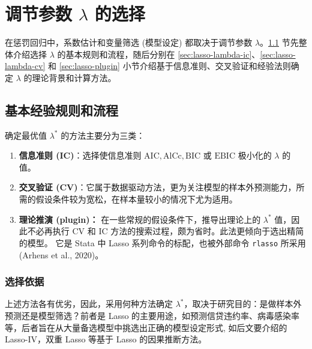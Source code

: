 


\section{调节参数 $\lambda$ 的选择}\label{sec:lasso-lambda}

在惩罚回归中，系数估计和变量筛选 (模型设定) 都取决于调节参数 $\lambda$。\ref{sec:lasso-lambda-intro} 节先整体介绍选择 $\lambda$ 的基本规则和流程，随后分别在 \ref{sec:lasso-lambda-ic}、\ref{sec:lasso-lambda-cv} 和 \ref{sec:lasso-plugin} 小节介绍基于信息准则、交叉验证和经验法则确定 $\lambda$ 的理论背景和计算方法。 

\subsection{基本经验规则和流程}\label{sec:lasso-lambda-intro}

确定最优值 $\lambda^*$ 的方法主要分为三类：
\begin{enumerate}
\item \textbf{信息准则 (IC)}：选择使信息准则 $\mathrm{AIC}, \mathrm{AlCc}, \mathrm{BIC}$ 或 $\mathrm{EBIC}$ 极小化的 $\lambda$ 的值。%
\item \textbf{交叉验证 (CV)}：它属于数据驱动方法，更为关注模型的样本外预测能力，所需的假设条件较为宽松，在样本量较小的情况下尤为适用。%
\item \textbf{理论推演 (plugin)：} 在一些常规的假设条件下，推导出理论上的 $\lambda^*$ 值，因此不必再执行 CV 和 IC 方法的搜索过程，颇为省时。此法更倾向于选出精简的模型。
它是 Stata 中 Lasso 系列命令的标配，也被外部命令 \texttt{rlasso} 所采用 (Arhens et al., 2020)。
\end{enumerate}

\subsubsection{选择依据}
上述方法各有优劣，因此，采用何种方法确定 $\lambda^*$，取决于研究目的：是做样本外预测还是模型筛选？前者是 Lasso 的主要用途，如预测信贷违约率、病毒感染率等，后者旨在从大量备选模型中挑选出正确的模型设定形式, 如后文要介绍的 Lasso-IV，双重 Lasso 等基于 Lasso 的因果推断方法。

